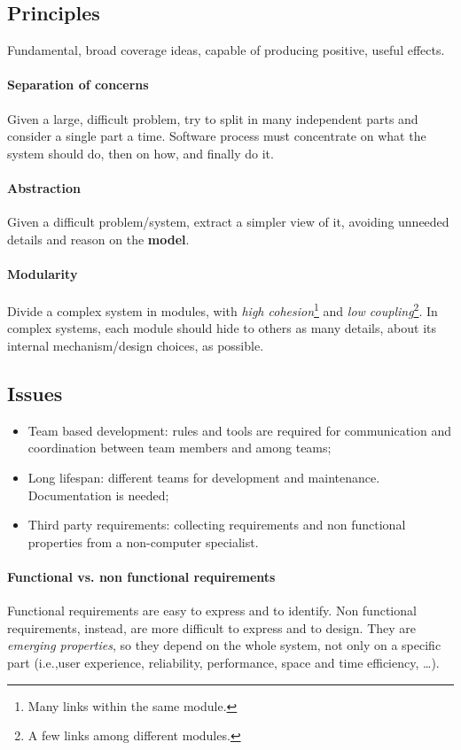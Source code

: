 \subsection{Principles}
Fundamental, broad coverage ideas, capable of producing positive, useful effects.

\paragraph{Separation of concerns}
Given a large, difficult problem, try to split in many independent parts and consider a single part a time. Software process must concentrate on what the system should do, then on how, and finally do it.

\paragraph{Abstraction}
Given a difficult problem/system, extract a simpler view of it, avoiding unneeded details and reason on the \textbf{model}.

\paragraph{Modularity}
Divide a complex system in modules, with \emph{high cohesion}\footnote{Many links within the same module.} and \emph{low coupling}\footnote{A few links among different modules.}. In complex systems, each module should hide to others as many details, about its internal mechanism/design choices, as possible.

\subsection{Issues}
\begin{itemize}
\item Team based development: rules and tools are required for communication and coordination between team members and among teams;
\item Long lifespan: different teams for development and maintenance. Documentation is needed;
\item Third party requirements: collecting requirements and non functional properties from a non-computer specialist.
\end{itemize}

\paragraph{Functional vs. non functional requirements}
Functional requirements are easy to express and to identify. Non functional requirements, instead, are more difficult to express and to design. They are \emph{emerging properties}, so they depend on the whole system, not only on a specific part (i.e.,\@ user experience, reliability, performance, space and time efficiency, \dots).